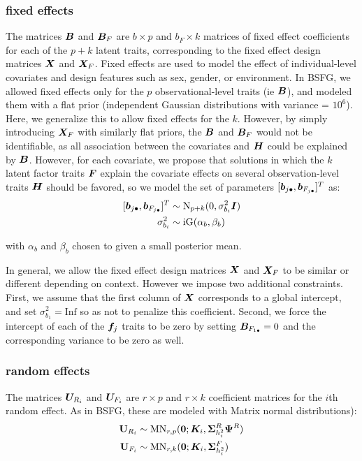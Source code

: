 \documentclass[11pt]{amsart}
\newcommand*{\B}[1]{\ifmmode\bm{#1}\else\textbf{#1}\fi}
\begin{document}
\subsubsection{fixed effects}
The matrices $\B{B}$ and $\B{B}_F$ are $b \times p$ and $b_F \times k$ matrices of fixed effect coefficients for each of the $p + k$ latent traits, corresponding to the fixed effect design matrices $\B{X}$ and $\B{X}_F$. Fixed effects are used to model the effect of individual-level covariates and design features such as sex, gender, or environment. In BSFG, we allowed fixed effects only for the $p$ observational-level traits (ie $\B{B}$), and modeled them with a flat prior (independent Gaussian distributions with variance = $10^6$). Here, we generalize this to allow fixed effects for the $k$. However, by simply introducing $\B{X}_F$ with similarly flat priors, the $\B{B}$ and $\B{B}_F$ would not be identifiable, as all association between the covariates and $\B{H}$ could be explained by $\B{B}$. However, for each covariate, we propose that solutions in which the $k$ latent factor traits $\B{F}$ explain the covariate effects on several observation-level traits $\B{H}$ should be favored, so we model the set of parameters $[\B{b}_{j\bullet}, \B{b}_{F_{j\bullet}}]^T$ as:
\begin{align}\begin{split}
[\B{b}_{j\bullet}, \B{b}_{F_{j\bullet}}]^T &\sim \mbox{N}_{p+k}(0,\sigma^2_{b_i}\B{I}) \\
\sigma^2_{b_i} &\sim \mbox{iG}(\alpha_b,\beta_b)
\end{split} \end{align}

\noindent with $\alpha_b$ and $\beta_b$ chosen to given a small posterior mean.

In general, we allow the fixed effect design matrices $\B{X}$ and $\B{X}_F$ to be similar or different depending on context. 
However we impose two additional constraints. First, we assume that the first column of $\B{X}$ corresponds to a global intercept, and set $\sigma^2_{b_1} = \mbox{Inf}$ so as not to penalize this coefficient. 
Second, we force the intercept of each of the $\B{f}_j$ traits to be zero by setting $\B{B}_{F_{1\bullet}} = 0$ and the corresponding variance to be zero as well.

\subsubsection{random effects}
The matrices $\B{U}_{R_i}$ and $\B{U}_{F_i}$ are $r \times p$ and $r \times k$ coefficient matrices for the $i$th random effect. As in BSFG, these are modeled with Matrix normal distributions):
\begin{align} \begin{split}
\B{U}_{R_i} &\sim \mbox{MN}_{r,p}(\B{0};\B{K}_i,\B{\Sigma}^R_{h^2_{i}}\B{\Psi}^R) \\
\B{U}_{F_i} &\sim \mbox{MN}_{r,k}(\B{0};\B{K}_i,\B{\Sigma}^F_{h^2_{i}})
\end{split} \end{align}
\end{document}
